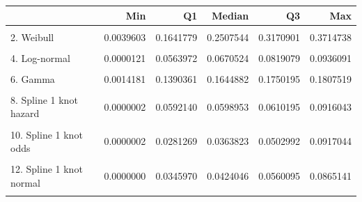 \documentclass[]{article}
\begin{document}
\begin{tabular}{lrrrrr}
\toprule
  & Min & Q1 & Median & Q3 & Max\\
\midrule
\cellcolor{gray!6}{1. Exponential} & \cellcolor{gray!6}{0.0585969} & \cellcolor{gray!6}{0.0585969} & \cellcolor{gray!6}{0.0585969} & \cellcolor{gray!6}{0.0585969} & \cellcolor{gray!6}{0.0585969}\\
2. Weibull & 0.0039603 & 0.1641779 & 0.2507544 & 0.3170901 & 0.3714738\\
\cellcolor{gray!6}{3. Gompertz} & \cellcolor{gray!6}{0.0342601} & \cellcolor{gray!6}{0.1256322} & \cellcolor{gray!6}{0.4037134} & \cellcolor{gray!6}{0.8634656} & \cellcolor{gray!6}{1.0000000}\\
4. Log-normal & 0.0000121 & 0.0563972 & 0.0670524 & 0.0819079 & 0.0936091\\
\cellcolor{gray!6}{5. Log-logistic} & \cellcolor{gray!6}{0.0022936} & \cellcolor{gray!6}{0.0533146} & \cellcolor{gray!6}{0.0700441} & \cellcolor{gray!6}{0.0935993} & \cellcolor{gray!6}{0.1092616}\\
6. Gamma & 0.0014181 & 0.1390361 & 0.1644882 & 0.1750195 & 0.1807519\\
\cellcolor{gray!6}{7. Generalised Gamma} & \cellcolor{gray!6}{0.0000000} & \cellcolor{gray!6}{0.0191123} & \cellcolor{gray!6}{0.0269247} & \cellcolor{gray!6}{0.0452063} & \cellcolor{gray!6}{0.0862100}\\
8. Spline 1 knot hazard & 0.0000002 & 0.0592140 & 0.0598953 & 0.0610195 & 0.0916043\\
\cellcolor{gray!6}{9. Spline 2 knots hazard} & \cellcolor{gray!6}{0.0000002} & \cellcolor{gray!6}{0.0576502} & \cellcolor{gray!6}{0.0585313} & \cellcolor{gray!6}{0.0599923} & \cellcolor{gray!6}{0.0923962}\\
10. Spline 1 knot odds & 0.0000002 & 0.0281269 & 0.0363823 & 0.0502992 & 0.0917044\\
\cellcolor{gray!6}{11. Spline 2 knots odds} & \cellcolor{gray!6}{0.0000002} & \cellcolor{gray!6}{0.0278516} & \cellcolor{gray!6}{0.0359503} & \cellcolor{gray!6}{0.0497462} & \cellcolor{gray!6}{0.0924439}\\
12. Spline 1 knot normal & 0.0000000 & 0.0345970 & 0.0424046 & 0.0560095 & 0.0865141\\
\cellcolor{gray!6}{13. Spline 2 knots normal} & \cellcolor{gray!6}{0.0000006} & \cellcolor{gray!6}{0.0281480} & \cellcolor{gray!6}{0.0348987} & \cellcolor{gray!6}{0.0473455} & \cellcolor{gray!6}{0.0953359}\\
\bottomrule
\end{tabular}
\end{document}
